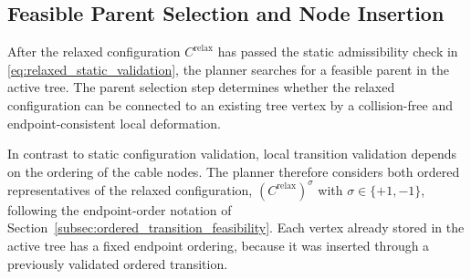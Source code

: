 \documentclass{pas}
\begin{document}


\subsection{Feasible Parent Selection and Node Insertion}
\label{subsec:gcr_parent_selection}

After the relaxed configuration \(C^{\mathrm{relax}}\) has passed the static
admissibility check in \eqref{eq:relaxed_static_validation}, the planner searches
for a feasible parent in the active tree. The parent selection step determines
whether the relaxed configuration can be connected to an existing tree vertex by
a collision-free and endpoint-consistent local deformation.

In contrast to static configuration validation, local transition validation
depends on the ordering of the cable nodes. The planner therefore considers
both ordered representatives of the relaxed configuration,
\(\left(C^{\mathrm{relax}}\right)^{\sigma}\) with \(\sigma\in\{+1,-1\}\),
following the endpoint-order notation of
Section~\ref{subsec:ordered_transition_feasibility}. Each vertex already stored
in the active tree has a fixed endpoint ordering, because it was inserted
through a previously validated ordered transition.
\end{document}
